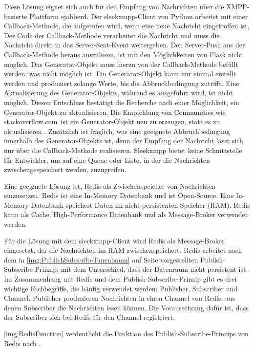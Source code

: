 \documentclass[a4paper,titlepage,halfparskip,12pt]{scrreprt}
\begin{document}
\begin{onehalfspacing}
Diese Lösung eignet sich auch für den Empfang von Nachrichten über die \acs{XMPP}-basierte Plattform ejabberd. Der sleekxmpp-Client von Python arbeitet mit einer Callback-Methode, die aufgerufen wird, wenn eine neue Nachricht eingetroffen ist. Der Code der Callback-Methode verarbeitet die Nachricht und muss die Nachricht direkt in das Server-Sent-Event weitergeben. Den Server-Push aus der Callback-Methode heraus auszulösen, ist mit den Möglichkeiten von Flask nicht möglich. Das Generator-Objekt muss hierzu von der Callback-Methode befüllt werden, was nicht möglich ist. Ein Generator-Objekt kann nur einmal erstellt werden und produziert solange Werte, bis die Abbruchbedingung zutrifft. Eine Aktualisierung des Generator-Objekts, während es ausgeführt wird, ist nicht möglich. Diesen Entschluss bestätigt die Recherche nach einer Möglichkeit, ein Generator-Objekt zu aktualisieren. Die Empfehlung von Communities wie \glqq stackoverflow.com\grqq\ ist ein Generator-Objekt neu zu erzeugen, statt es zu aktualisieren \cite{resetGeneratorObjectPython}. Zusätzlich ist fraglich, was eine geeignete Abbruchbedingung innerhalb des Generator-Objekts ist, denn der Empfang der Nachricht lässt sich nur über die Callback-Methode realisieren. Sleekxmpp bietet keine Schnittstelle für Entwickler, um auf eine Queue oder Liste, in der die Nachrichten zwischengespeichert werden, zuzugreifen.

Eine geeignete Lösung ist, Redis als Zwischenspeicher von Nachrichten einzusetzen. Redis ist eine In-Memory Datenbank und ist Open-Source. Eine In-Memory Datenbank speichert Daten im nicht persistenten Speicher (\acs{RAM}). Redis kann als Cache, High-Performance Datenbank und als Message-Broker verwendet werden.\cite{redisDocumentation}

Für die Lösung mit dem sleekxmpp-Client wird Redis als Message-Broker eingesetzt, der die Nachrichten im \acs{RAM} zwischenspeichert. Redis arbeitet nach dem in \autoref{img:PublishSubscribeTanenbaum} auf Seite \pageref{img:PublishSubscribeTanenbaum} vorgestellten Publish-Subscribe-Prinzip, mit dem Unterschied, dass der Datenraum nicht persistent ist. Im Zusammenhang mit Redis und dem Publish-Subscribe-Prinzip gibt es drei wichtige Fachbegriffe, die häufig verwendet werden: Publisher, Subscriber und Channel. Publisher produzieren Nachrichten in einen Channel von Redis, aus denen Subscriber die Nachrichten lesen können. Die Voraussetzung dafür ist, dass der Subscriber sich bei Redis für den Channel registriert.

\autoref{img:RedisFunction} verdeutlicht die Funktion des Publish-Subscribe-Prinzips von Redis nach \cite{redisDocumentation}.


\end{onehalfspacing}
\end{document}
